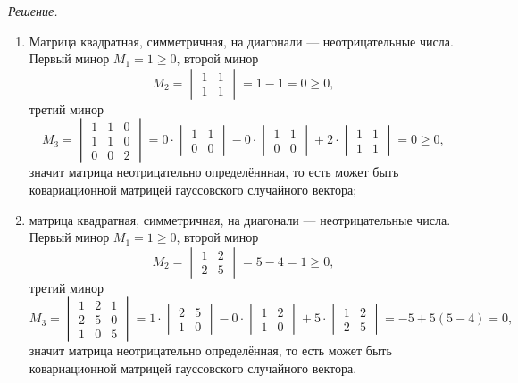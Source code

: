 \textit{Решение.}
\begin{enumerate}[label=\alph*)]
  \item Матрица квадратная, симметричная, на диагонали --- неотрицательные числа.
  Первый минор $M_1 = 1 \geq 0$, второй минор
  $$M_2 =
    \begin{vmatrix}
      1 & 1 \\
      1 & 1
    \end{vmatrix} =
    1 - 1 =
    0 \geq 0,$$
  третий минор
  $$M_3 =
    \begin{vmatrix}
      1 & 1 & 0 \\
      1 & 1 & 0 \\
      0 & 0 & 2
    \end{vmatrix} =
    0 \cdot
    \begin{vmatrix}
      1 & 1 \\
      0 & 0
    \end{vmatrix} - 0 \cdot
    \begin{vmatrix}
      1 & 1 \\
      0 & 0
    \end{vmatrix} + 2 \cdot
    \begin{vmatrix}
      1 & 1 \\
      1 & 1
    \end{vmatrix} =
    0 \geq
    0,$$
  значит матрица неотрицательно определённная,
  то есть может быть ковариационной матрицей гауссовского случайного вектора;
  \item матрица квадратная, симметричная, на диагонали --- неотрицательные числа.
  Первый минор $M_1 = 1 \geq 0$, второй минор
  $$M_2 =
    \begin{vmatrix}
      1 & 2 \\
      2 & 5
    \end{vmatrix} =
    5 - 4 =
    1 \geq
    0,$$
  третий минор
  $$M_3 =
    \begin{vmatrix}
      1 & 2 & 1 \\
      2 & 5 & 0 \\
      1 & 0 & 5
    \end{vmatrix} =
    1 \cdot
    \begin{vmatrix}
      2 & 5 \\
      1 & 0
    \end{vmatrix} - 0 \cdot
    \begin{vmatrix}
      1 & 2 \\
      1 & 0
    \end{vmatrix} + 5 \cdot
    \begin{vmatrix}
      1 & 2 \\
      2 & 5
    \end{vmatrix} =
    -5 + 5 \left( 5 - 4 \right) =
    0,$$
  значит матрица неотрицательно определённая,
  то есть может быть ковариационной матрицей гауссовского случайного вектора.
\end{enumerate}


